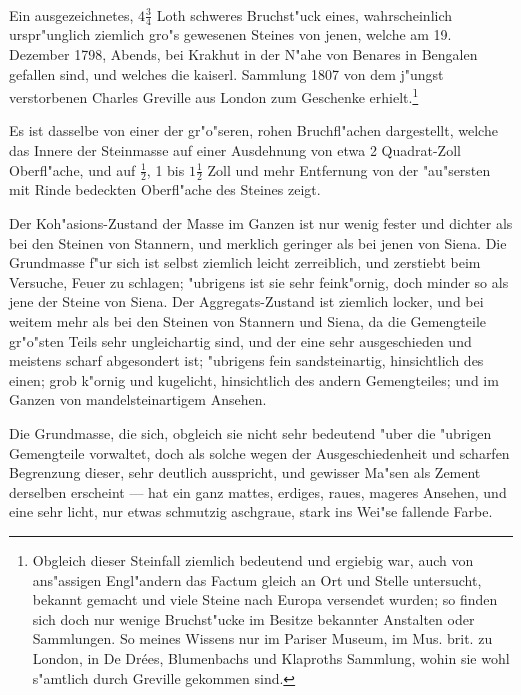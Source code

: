 \documentclass[a4paper, 11pt, oneside, german]{article}
\begin{document}
\paragraph{}
Ein ausgezeichnetes, $4\frac{3}{4}$ Loth schweres Bruchst"uck eines, wahrscheinlich urspr"unglich ziemlich gro"s gewesenen Steines von jenen, welche am 19. Dezember 1798, Abends, bei Krakhut in der N"ahe von Benares in Bengalen gefallen sind, und welches die kaiserl. Sammlung 1807 von dem j"ungst verstorbenen Charles Greville aus London zum Geschenke erhielt.\footnote{Obgleich dieser Steinfall ziemlich bedeutend und ergiebig war, auch von ans"assigen Engl"andern das Factum gleich an Ort und Stelle untersucht, bekannt gemacht und viele Steine nach Europa versendet wurden; so finden sich doch nur wenige Bruchst"ucke im Besitze bekannter Anstalten oder Sammlungen. So meines Wissens nur im Pariser Museum, im Mus. brit. zu London, in De Drées, Blumenbachs und Klaproths Sammlung, wohin sie wohl s"amtlich durch Greville gekommen sind.}

Es ist dasselbe von einer der gr"o"seren, rohen Bruchfl"achen dargestellt, welche das Innere der Steinmasse auf einer Ausdehnung von etwa 2 Quadrat-Zoll Oberfl"ache, und auf $\frac{1}{2}$, 1 bis $1\frac{1}{2}$ Zoll und mehr Entfernung von der "au"sersten mit Rinde bedeckten Oberfl"ache des Steines zeigt.

Der Koh"asions-Zustand der Masse im Ganzen ist nur wenig fester und dichter als bei den Steinen von Stannern, und merklich geringer als bei jenen von Siena. Die Grundmasse f"ur sich ist selbst ziemlich leicht zerreiblich, und zerstiebt beim Versuche, Feuer zu schlagen; "ubrigens ist sie sehr feink"ornig, doch minder so als jene der Steine von Siena. Der Aggregats-Zustand ist ziemlich locker, und bei weitem mehr als bei den Steinen von Stannern und Siena, da die Gemengteile gr"o"sten Teils sehr ungleichartig sind, und der eine sehr ausgeschieden und meistens scharf abgesondert ist; "ubrigens fein sandsteinartig, hinsichtlich des einen; grob k"ornig und kugelicht, hinsichtlich des andern Gemengteiles; und im Ganzen von mandelsteinartigem Ansehen.

Die Grundmasse, die sich, obgleich sie nicht sehr bedeutend "uber die "ubrigen Gemengteile vorwaltet, doch als solche wegen der Ausgeschiedenheit und scharfen Begrenzung dieser, sehr deutlich ausspricht, und gewisser Ma"sen als Zement derselben erscheint --- hat ein ganz mattes, erdiges, raues, mageres Ansehen, und eine sehr licht, nur etwas schmutzig aschgraue, stark ins Wei"se fallende Farbe.
\end{document}
